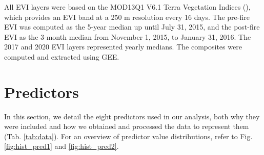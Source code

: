 \documentclass[
  fontsize=12pt,
  paper=a4,
  parskip=half,
  headings=big,
  DIV=12
]{scrreprt}
\begin{document}
All EVI layers were based on the MOD13Q1 V6.1 Terra Vegetation Indices (\cite{didan_modisterra_2021}), which provides an EVI band at a 250 m resolution every 16 days. The pre-fire EVI was computed as the 5-year median up until July 31, 2015, and the post-fire EVI as the 3-month median from November 1, 2015, to January 31, 2016. The 2017 and 2020 EVI layers represented yearly medians. The composites were computed and extracted using GEE.

\section{Predictors}

In this section, we detail the eight predictors used in our analysis, both why they were included and how we obtained and processed the data to represent them (Tab. \ref{tab:data}). For an overview of predictor value distributions, refer to Fig. \ref{fig:hist_pred1} and \ref{fig:hist_pred2}.
\end{document}
